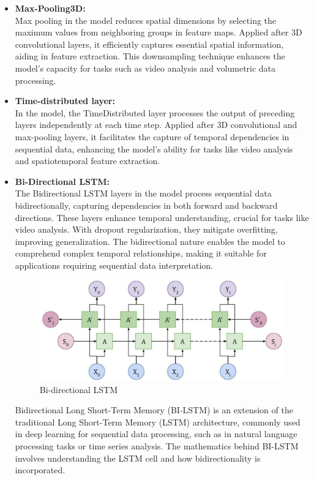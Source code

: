 \begin{enumerate}
\begin{itemize}
 \item \textbf{Max-Pooling3D:}\\
 Max pooling in the model reduces spatial dimensions by selecting the maximum values from neighboring groups in feature maps. Applied after 3D convolutional layers, it efficiently captures essential spatial information, aiding in feature extraction. This downsampling technique enhances the model's capacity for tasks such as video analysis and volumetric data processing.
 \item \textbf{Time-distributed layer:}\\
 In the model, the TimeDistributed layer processes the output of preceding layers independently at each time step. Applied after 3D convolutional and max-pooling layers, it facilitates the capture of temporal dependencies in sequential data, enhancing the model's ability for tasks like video analysis and spatiotemporal feature extraction.
 \item \textbf{Bi-Directional LSTM:}\\
 The Bidirectional LSTM layers in the model process sequential data bidirectionally, capturing dependencies in both forward and backward directions. These layers enhance temporal understanding, crucial for tasks like video analysis. With dropout regularization, they mitigate overfitting, improving generalization. The bidirectional nature enables the model to comprehend complex temporal relationships, making it suitable for applications requiring sequential data interpretation.\\
 \begin{figure}[h]
     \centering
     \includegraphics[width=1\linewidth]{img/BI-lstm.jpg}
     \caption{Bi-directional LSTM}
     
 \end{figure}

 Bidirectional Long Short-Term Memory (BI-LSTM) is an extension of the traditional Long Short-Term Memory (LSTM) architecture, commonly used in deep learning for sequential data processing, such as in natural language processing tasks or time series analysis. The mathematics behind BI-LSTM involves understanding the LSTM cell and how bidirectionality is incorporated.


\end{itemize}
\end{enumerate}
